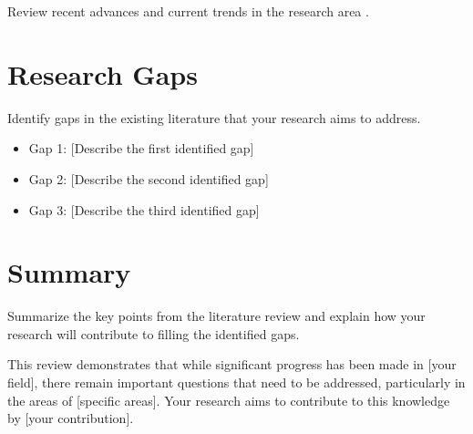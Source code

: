 Review recent advances and current trends in the research area \cite{example2024}.

\section{Research Gaps}

Identify gaps in the existing literature that your research aims to address.

\begin{itemize}
    \item Gap 1: [Describe the first identified gap]
    \item Gap 2: [Describe the second identified gap]
    \item Gap 3: [Describe the third identified gap]
\end{itemize}

\section{Summary}

Summarize the key points from the literature review and explain how your research will contribute to filling the identified gaps.

This review demonstrates that while significant progress has been made in [your field], there remain important questions that need to be addressed, particularly in the areas of [specific areas]. Your research aims to contribute to this knowledge by [your contribution].